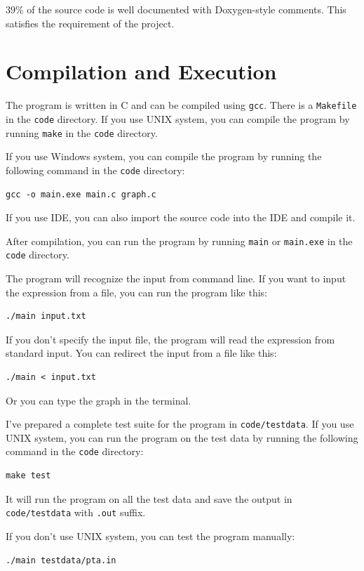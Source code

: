 \documentclass[a4paper,oneside]{book}
\begin{document}
$39\%$ of the source code is well documented with Doxygen-style comments. This
satisfies the requirement of the project.

\section{Compilation and Execution}

The program is written in C and can be compiled using \verb|gcc|. There is a \verb|Makefile| in the \verb|code| directory. If you use UNIX system, you can compile the program by running \verb|make| in the \verb|code| directory.

If you use Windows system, you can compile the program by running the following command in the \verb|code| directory:

\begin{verbatim}
gcc -o main.exe main.c graph.c
\end{verbatim}

If you use IDE, you can also import the source code into the IDE and compile it.

After compilation, you can run the program by running \verb|main| or \verb|main.exe| in the \verb|code| directory.

The program will recognize the input from command line. If you want to input the expression from a file, you can run the program like this:

\begin{verbatim}
./main input.txt 
\end{verbatim}

If you don't specify the input file, the program will read the expression from standard input. You can redirect the input from a file like this:

\begin{verbatim}
./main < input.txt
\end{verbatim}

Or you can type the graph in the terminal.

I've prepared a complete test suite for the program in \verb|code/testdata|. If you use UNIX system, you can run the program on the test data by running the following command in the \verb|code| directory:

\begin{verbatim}
make test
\end{verbatim}

It will run the program on all the test data and save the output in \verb|code/testdata| with \verb|.out| suffix.

If you don't use UNIX system, you can test the program manually:

\begin{verbatim}
./main testdata/pta.in 
\end{verbatim}


\end{document}
